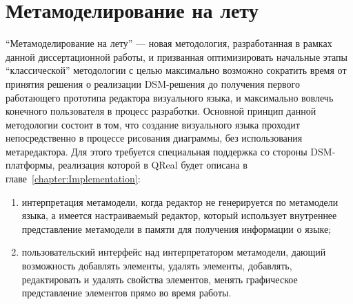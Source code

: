 \section{Метамоделирование на лету}
\label{chapter:MetamodelingOnFly}
"`Метамоделирование на лету"' --- новая методология, разработанная в рамках данной 
диссертационной работы, и призванная оптимизировать начальные этапы "`классической"' 
методологии с целью максимально возможно сократить время от принятия решения о реализации 
DSM-решения до получения первого работающего прототипа редактора визуального языка, 
и максимально вовлечь конечного пользователя в процесс разработки. Основной принцип 
данной методологии состоит в том, что создание визуального языка проходит непосредственно 
в процессе рисования диаграммы, без использования метаредактора. Для этого требуется 
специальная поддержка со стороны DSM-платформы, реализация которой в QReal будет описана 
в главе~\ref{chapter:Implementation}:
\begin{enumerate}
	\item интерпретация метамодели, когда редактор не генерируется по метамодели языка, 
		а имеется настраиваемый редактор, который использует внутреннее представление 
		метамодели в памяти для получения информации о языке;
	\item пользовательский интерфейс над интерпретатором метамодели, дающий возможность 
		добавлять элементы, удалять элементы, добавлять, редактировать и удалять свойства 
		элементов, менять графическое представление элементов прямо во время работы.
\end{enumerate}

